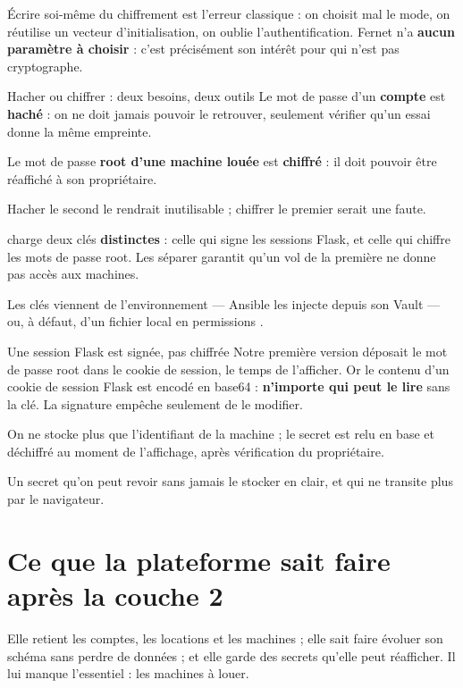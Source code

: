 Écrire soi-même du chiffrement est l'erreur classique : on choisit mal le mode,
on réutilise un vecteur d'initialisation, on oublie l'authentification. Fernet
n'a \textbf{aucun paramètre à choisir} : c'est précisément son intérêt pour qui
n'est pas cryptographe.

\begin{notion}{Hacher ou chiffrer : deux besoins, deux outils}
Le mot de passe d'un \textbf{compte} est \textbf{haché} : on ne doit jamais
pouvoir le retrouver, seulement vérifier qu'un essai donne la même empreinte.

Le mot de passe \textbf{root d'une machine louée} est \textbf{chiffré} : il doit
pouvoir être réaffiché à son propriétaire.

Hacher le second le rendrait inutilisable ; chiffrer le premier serait une
faute.
\end{notion}

\role
{} charge deux clés \textbf{distinctes} : celle qui
signe les sessions Flask, et celle qui chiffre les mots de passe root. Les
séparer garantit qu'un vol de la première ne donne pas accès aux machines.

Les clés viennent de l'environnement --- Ansible les injecte depuis son Vault ---
ou, à défaut, d'un fichier local en permissions .



\begin{piege}{Une session Flask est signée, pas chiffrée}
Notre première version déposait le mot de passe root dans le cookie de session,
le temps de l'afficher. Or le contenu d'un cookie de session Flask est encodé en
base64 : \textbf{n'importe qui peut le lire} sans la clé. La signature empêche
seulement de le modifier.

On ne stocke plus que l'identifiant de la machine ; le secret est relu en base
et déchiffré au moment de l'affichage, après vérification du propriétaire.
\end{piege}

\apport
Un secret qu'on peut revoir sans jamais le stocker en clair, et qui ne transite
plus par le navigateur.

\section*{Ce que la plateforme sait faire après la couche 2}

Elle retient les comptes, les locations et les machines ; elle sait faire
évoluer son schéma sans perdre de données ; et elle garde des secrets qu'elle
peut réafficher. Il lui manque l'essentiel : les machines à louer.
